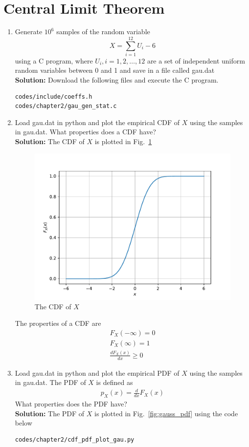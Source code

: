 \documentclass[journal,10pt,twocolumn]{IEEEtran}
\newcommand\figref{Fig.~\ref}
\newcommand{\solution}{\noindent \textbf{Solution: }}
\begin{document}
\section{Central Limit Theorem}
\begin{enumerate}
%
%
\item
Generate $10^6$ samples of the random variable
%
\begin{equation}
X = \sum_{i=1}^{12}U_i -6
\end{equation}
%
using a C program, where $U_i, i = 1,2,\dots, 12$ are  a set of independent uniform random variables between 0 and 1
and save in a file called gau.dat\\
\solution Download the following files and execute the  C program.
\begin{lstlisting}
codes/include/coeffs.h
codes/chapter2/gau_gen_stat.c
\end{lstlisting}
%
\item
Load gau.dat in python and plot the empirical CDF of $X$ using the samples in gau.dat. What properties does a CDF have?
\\
\solution The CDF of $X$ is plotted in \figref{fig:gauss_cdf}
\begin{figure}[H]
\centering
\includegraphics[width=\columnwidth]{./figs/chapter2/gau_cdf.pdf}
\caption{The CDF of $X$}
\label{fig:gauss_cdf}
\end{figure}
The properties of a CDF are
\begin{eqnarray}
	F_X(-\infty) = 0\\
	F_X(\infty) = 1\\
	\frac{dF_X(x)}{dx} \ge 0
\end{eqnarray}
\item
Load gau.dat in python and plot the empirical PDF of $X$ using the samples in gau.dat. The PDF of $X$ is defined as
\begin{align}
p_{X}(x) = \frac{d}{dx}F_{X}(x)
\end{align}
What properties does the PDF have?
\\
\solution The PDF of $X$ is plotted in \figref{fig:gauss_pdf} using the code below
\begin{lstlisting}
codes/chapter2/cdf_pdf_plot_gau.py
\end{lstlisting}


\end{enumerate}
\end{document}
